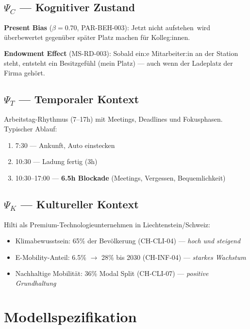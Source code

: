 \documentclass[11pt,a4paper]{article}
\begin{document}
\subsection{$\Psi_C$ --- Kognitiver Zustand}

\textbf{Present Bias} ($\beta = 0.70$, PAR-BEH-003): \guillemotleft Jetzt nicht aufstehen\guillemotright\ wird \"uberbewertet gegen\"uber \guillemotleft sp\"ater Platz machen f\"ur Kolleg:innen\guillemotright.

\textbf{Endowment Effect} (MS-RD-003): Sobald ein:e Mitarbeiter:in an der Station steht, entsteht ein Besitzgef\"uhl (\guillemotleft mein Platz\guillemotright) --- auch wenn der Ladeplatz der Firma geh\"ort.

\subsection{$\Psi_T$ --- Temporaler Kontext}

Arbeitstag-Rhythmus (7--17h) mit Meetings, Deadlines und Fokusphasen. Typischer Ablauf:
\begin{enumerate}[noitemsep]
\item 7:30 --- Ankunft, Auto einstecken
\item 10:30 --- Ladung fertig (3h)
\item 10:30--17:00 --- \textbf{6.5h Blockade} (Meetings, Vergessen, Bequemlichkeit)
\end{enumerate}

\subsection{$\Psi_K$ --- Kultureller Kontext}

Hilti als Premium-Technologieunternehmen in Liechtenstein/Schweiz:
\begin{itemize}[noitemsep]
\item Klimabewusstsein: 65\% der Bev\"olkerung (CH-CLI-04) --- \textit{hoch und steigend}
\item E-Mobility-Anteil: 6.5\% $\rightarrow$ 28\% bis 2030 (CH-INF-04) --- \textit{starkes Wachstum}
\item Nachhaltige Mobilit\"at: 36\% Modal Split (CH-CLI-07) --- \textit{positive Grundhaltung}
\end{itemize}


\section{Modellspezifikation}
\end{document}
